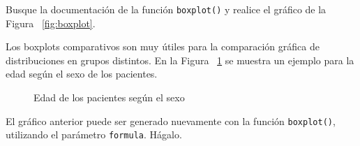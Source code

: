 \documentclass{prob}
\begin{document}
\begin{problema}
	\begin{parte}
	Busque la documentación de la función \texttt{boxplot()} y realice el gráfico de la 	Figura ~\ref{fig:boxplot}.
	\end{parte}
	
	\begin{parte}
	Los boxplots comparativos son muy útiles para la comparación gráfica de distribuciones en grupos
distintos. En la Figura ~\ref{fig:boxplot2} se muestra un ejemplo para la edad según el sexo de los pacientes.

\begin{figure}[!ht]
    \centering
    
    \caption{Edad de los pacientes según el sexo}
    \label{fig:boxplot2}
\end{figure}		 
	\end{parte}

	El gráfico anterior puede ser generado nuevamente con la función \texttt{boxplot()}, utilizando el parámetro \texttt{formula}. Hágalo.\\
	
	\noindent{}
	

	
	\end{problema}
	
\end{document}
